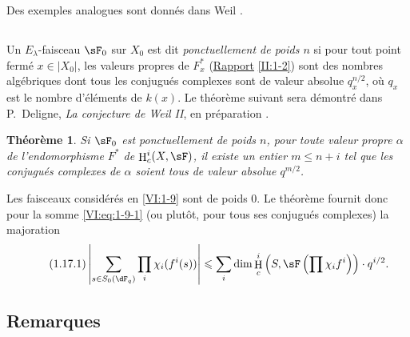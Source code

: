 \documentclass[oneside]{book}
\DeclareMathOperator{\h}{H}
\theoremstyle{sga-source}
\theoremstyle{sga-source-dash}
\theoremstyle{sga-source-dotdash}
\theoremstyle{sga-source-number-note-dash}
\theoremstyle{sga-source-note-number-dotdash}
\theoremstyle{sga-source-example-dotdash}
\theoremstyle{sga-source-inline-number}
\theoremstyle{sga-source-bare-number}
\theoremstyle{sga-source}
\newtheorem{theorem_}[subsection]{Théorème}
\newcommand{\PrintPage}[1]{}\newcommand{\MathPage}[1]{}\newcommand{\PrintCite}[2]{#1}\newcommand{\var}[3]{#2}
\begin{document}
Des exemples analogues sont donnés dans Weil \cite[App V, $3^\text{e}$ éd.]{we74}. 





\subsection{}\label{VI:1-16}

Un $E_\lambda$-faisceau $\sF_0$ sur $X_0$ est dit \emph{ponctuellement de 
poids $n$} si pour tout point fermé $x\in |X_0|$, les valeurs propres de 
$F_x^\ast$ (\hyperref[II]{Rapport} \ref{II:1-2}) sont des nombres algébriques 
dont tous les conjugués complexes sont de valeur absolue 
$q_x^{n/2}$, où $q_x$ est le nombre d'éléments de $k(x)$. Le théorème 
suivant sera démontré dans P.~Deligne, \emph{La conjecture de Weil II}, en préparation \cite{de80}. 





\PrintPage{178}
\begin{theorem_}\label{VI:1-17}
Si $\sF_0$ est ponctuellement de poids $n$, pour toute valeur propre $\alpha$ 
de l'endomorphisme $F^\ast$ de $\h_c^i(X,\sF)$, il existe un entier 
$m\leqslant n+i$ tel que les conjugués complexes de $\alpha$ soient tous de 
valeur absolue $q^{m/2}$.
\end{theorem_}

Les faisceaux considérés en \ref{VI:1-9} sont de poids $0$. Le théorème 
fournit donc pour la somme \ref{VI:eq:1-9-1} (ou plutôt, pour tous ses 
conjugués complexes) la majoration 
\begin{equation*}\tag{1.17.1}\label{VI:eq:1-17-1}
  \left|\sum_{s\in S_0(\dF_q)} \prod_i \chi_i(f^i(s)) \right| \leqslant \sum_i \dim \h_c^i\left(S,\sF\left(\prod \chi_i f^i\right)\right)\cdot q^{i/2} \text{.}
\end{equation*}





\subsection{Remarques}\label{VI:1-18}
\end{document}
